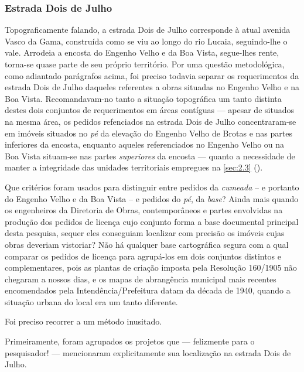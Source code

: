 \subsubsection{Estrada Dois de Julho}


Topograficamente falando, a estrada Dois de Julho corresponde à atual avenida Vasco da Gama, construída como se viu ao longo do rio Lucaia, seguindo-lhe o vale. Arrodeia a encosta do Engenho Velho e da Boa Vista, segue-lhes rente, torna-se quase parte de seu próprio território.  Por uma questão metodológica, como adiantado parágrafos acima, foi preciso todavia separar os requerimentos da estrada Dois de Julho daqueles referentes a obras situadas no Engenho Velho e na Boa Vista. Recomandavam-no tanto a situação topográfica um tanto distinta destes dois conjuntos de requerimentos em áreas contíguas --- apesar de situados na mesma área, os pedidos refenciados na estrada Dois de Julho concentraram-se em imóveis situados no \textit{pé} da elevação do Engenho Velho de Brotas e nas partes inferiores da encosta, enquanto aqueles referenciados no Engenho Velho ou na Boa Vista situam-se nas partes \textit{superiores} da encosta --- quanto a necessidade de manter a integridade das unidades territoriais empregues na \autoref{sec:2.3} (\pageref{sec:2.3}).

Que critérios foram usados para distinguir entre pedidos da \textit{cumeada} -- e portanto do Engenho Velho e da Boa Vista -- e pedidos do \textit{pé}, da \textit{base}? Ainda mais quando os engenheiros da Diretoria de Obras, contemporâneos e partes envolvidas na produção dos pedidos de licença cujo conjunto forma a base documental principal desta pesquisa, sequer eles conseguiam localizar com precisão os imóveis cujas obras deveriam vistoriar? Não há qualquer base cartográfica segura com a qual comparar os pedidos de licença para agrupá-los em dois conjuntos distintos e complementares, pois as plantas de criação imposta pela Resolução 160/1905 não chegaram a nossos dias, e os mapas de abrangência municipal mais recentes encomendados pela Intendência/Prefeitura datam da década de 1940, quando a situação urbana do local era um tanto diferente. 

Foi preciso recorrer a um método inusitado. 

Primeiramente, foram agrupados os projetos que --- felizmente para o pesquisador! --- mencionaram explicitamente sua localização na estrada Dois de Julho. 

